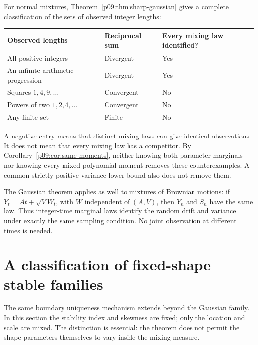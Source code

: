 \documentclass[11pt,letterpaper]{article}
\theoremstyle{definition}
\theoremstyle{remark}
\newcommand{\1}{\mathbf 1}
\begin{document}
For normal mixtures, Theorem~\ref{p09:thm:sharp-gaussian} gives a complete
classification of the sets of observed integer lengths:
\begin{center}
\begin{tabular}{@{}lll@{}}
\toprule
Observed lengths & Reciprocal sum & Every mixing law identified?\\
\midrule
All positive integers & Divergent & Yes\\
An infinite arithmetic progression & Divergent & Yes\\
Squares $1,4,9,\ldots$ & Convergent & No\\
Powers of two $1,2,4,\ldots$ & Convergent & No\\
Any finite set & Finite & No\\
\bottomrule
\end{tabular}
\end{center}
A negative entry means that distinct mixing laws can give identical
observations. It does not mean that every mixing law has a competitor.
By Corollary~\ref{p09:cor:same-moments}, neither knowing both parameter
marginals nor knowing every mixed polynomial moment removes these
counterexamples. A common strictly positive variance lower bound
also does not remove them.

The Gaussian theorem applies as well to mixtures of Brownian motions:
if $Y_t=At+\sqrt V W_t$, with $W$ independent of $(A,V)$, then
$Y_n$ and $S_n$ have the same law. Thus integer-time marginal laws
identify the random drift and variance under exactly the same
sampling condition. No joint observation at different times is needed.


\section{A classification of fixed-shape stable families}
\label{p09:sec:stable-classification}

The same boundary uniqueness mechanism extends beyond the Gaussian family.
In this section the stability index and skewness are fixed; only the location
and scale are mixed.  The distinction is essential: the theorem does not
permit the shape parameters themselves to vary inside the mixing measure.
\end{document}
